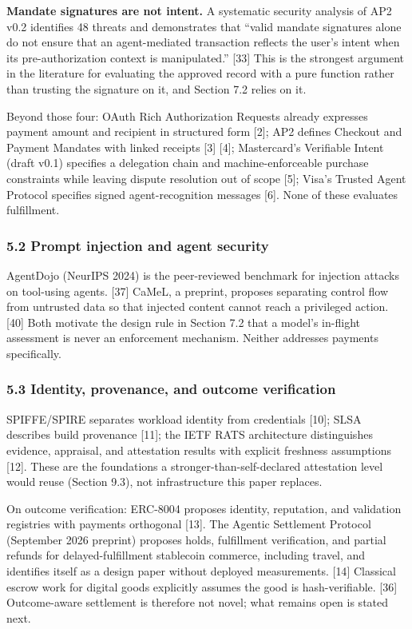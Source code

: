 \documentclass[
  11pt,
  letterpaper,
]{article}
\begin{document}
\textbf{Mandate signatures are not intent.} A systematic security
analysis of AP2 v0.2 identifies 48 threats and demonstrates that ``valid
mandate signatures alone do not ensure that an agent-mediated
transaction reflects the user's intent when its pre-authorization
context is manipulated.'' {[}33{]} This is the strongest argument in the
literature for evaluating the approved record with a pure function
rather than trusting the signature on it, and Section 7.2 relies on it.

Beyond those four: OAuth Rich Authorization Requests already expresses
payment amount and recipient in structured form {[}2{]}; AP2 defines
Checkout and Payment Mandates with linked receipts {[}3{]} {[}4{]};
Mastercard's Verifiable Intent (draft v0.1) specifies a delegation chain
and machine-enforceable purchase constraints while leaving dispute
resolution out of scope {[}5{]}; Visa's Trusted Agent Protocol specifies
signed agent-recognition messages {[}6{]}. None of these evaluates
fulfillment.

\subsubsection{5.2 Prompt injection and agent
security}\label{prompt-injection-and-agent-security}

AgentDojo (NeurIPS 2024) is the peer-reviewed benchmark for injection
attacks on tool-using agents. {[}37{]} CaMeL, a preprint, proposes
separating control flow from untrusted data so that injected content
cannot reach a privileged action. {[}40{]} Both motivate the design rule
in Section 7.2 that a model's in-flight assessment is never an
enforcement mechanism. Neither addresses payments specifically.

\subsubsection{5.3 Identity, provenance, and outcome
verification}\label{identity-provenance-and-outcome-verification}

SPIFFE/SPIRE separates workload identity from credentials {[}10{]}; SLSA
describes build provenance {[}11{]}; the IETF RATS architecture
distinguishes evidence, appraisal, and attestation results with explicit
freshness assumptions {[}12{]}. These are the foundations a
stronger-than-self-declared attestation level would reuse (Section 9.3),
not infrastructure this paper replaces.

On outcome verification: ERC-8004 proposes identity, reputation, and
validation registries with payments orthogonal {[}13{]}. The Agentic
Settlement Protocol (September 2026 preprint) proposes holds,
fulfillment verification, and partial refunds for delayed-fulfillment
stablecoin commerce, including travel, and identifies itself as a design
paper without deployed measurements. {[}14{]} Classical escrow work for
digital goods explicitly assumes the good is hash-verifiable. {[}36{]}
Outcome-aware settlement is therefore not novel; what remains open is
stated next.
\end{document}
